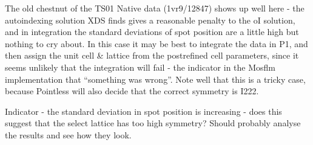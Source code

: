 \documentclass[a4paper, 11pt]{article}
\begin{document}
The old chestnut of the TS01 Native data (1vr9/12847) shows up well here - the
autoindexing solution XDS finds gives a reasonable penalty to the oI solution,
and in integration the standard deviations of spot position are a little 
high but nothing to cry about. In this case it may be best to integrate the 
data in P1, and then assign the unit cell \& lattice from the postrefined 
cell parameters, since it seems unlikely that the integration will fail - 
the indicator in the Mosflm implementation that ``something was wrong''. Note
well that this is a tricky case, because Pointless will also decide that the
correct symmetry is I222.

Indicator - the standard deviation in spot position is increasing - does
this suggest that the select lattice has too high symmetry? Should probably
analyse the results and see how they look.
\end{document}

